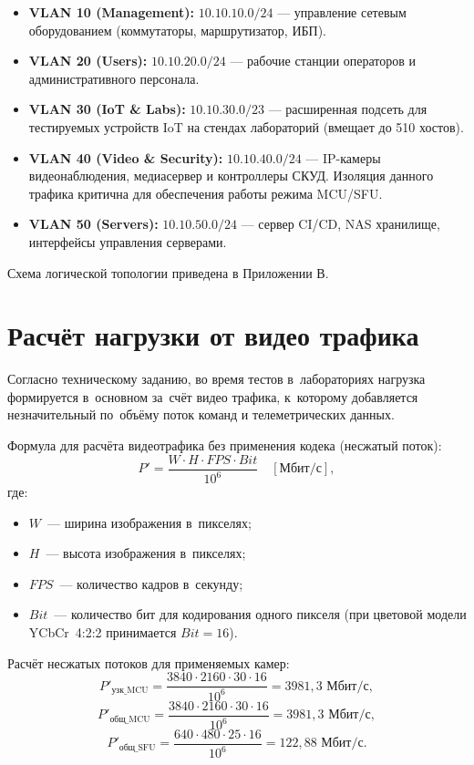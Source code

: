\documentclass{bmstu}
\begin{document}
\begin{itemize}
    \item \textbf{VLAN 10 (Management):} $10.10.10.0/24$ — управление сетевым оборудованием (коммутаторы, маршрутизатор, ИБП).
    \item \textbf{VLAN 20 (Users):} $10.10.20.0/24$ — рабочие станции операторов и административного персонала.
    \item \textbf{VLAN 30 (IoT \& Labs):} $10.10.30.0/23$ — расширенная подсеть для тестируемых устройств IoT на стендах лабораторий (вмещает до 510 хостов).
    \item \textbf{VLAN 40 (Video \& Security):} $10.10.40.0/24$ — IP-камеры видеонаблюдения, медиасервер и контроллеры СКУД. Изоляция данного трафика критична для обеспечения работы режима MCU/SFU.
    \item \textbf{VLAN 50 (Servers):} $10.10.50.0/24$ — сервер CI/CD, NAS хранилище, интерфейсы управления серверами.
\end{itemize}

Схема логической топологии приведена в Приложении В.


\section{Расчёт нагрузки от видео трафика}

Согласно техническому заданию, во время тестов в~лабораториях нагрузка формируется в~основном за~счёт видео трафика, к~которому добавляется незначительный по~объёму поток команд и телеметрических данных.

Формула для расчёта видеотрафика без применения кодека (несжатый поток):
\begin{equation}
    P' = \frac{W \cdot H \cdot FPS \cdot Bit}{10^{6}} \quad [\text{Мбит/с}],
    \label{eq:bitrate_raw}
\end{equation}
где:
\begin{itemize}
    \item $W$~--- ширина изображения в~пикселях;
    \item $H$~--- высота изображения в~пикселях;
    \item $FPS$~--- количество кадров в~секунду;
    \item $Bit$~--- количество бит для кодирования одного пикселя (при цветовой модели YCbCr~4:2:2 принимается $Bit = 16$).
\end{itemize}

Расчёт несжатых потоков для применяемых камер:
\begin{equation}
    P'_{\text{узк\_MCU}} = \frac{3840 \cdot 2160 \cdot 30 \cdot 16}{10^{6}} = 3981{,}3 \text{ Мбит/с},
    \label{eq:raw_narrow}
\end{equation}
\begin{equation}
    P'_{\text{общ\_MCU}} = \frac{3840 \cdot 2160 \cdot 30 \cdot 16}{10^{6}} = 3981{,}3 \text{ Мбит/с},
    \label{eq:raw_overview_mcu}
\end{equation}
\begin{equation}
    P'_{\text{общ\_SFU}} = \frac{640 \cdot 480 \cdot 25 \cdot 16}{10^{6}} = 122{,}88 \text{ Мбит/с}.
    \label{eq:raw_overview_sfu}
\end{equation}
\end{document}
